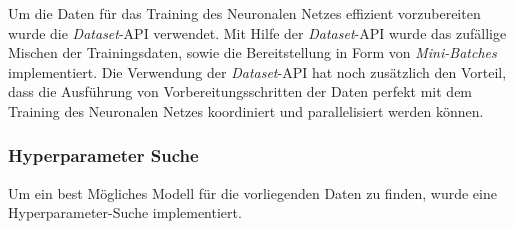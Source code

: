 Um die Daten für das Training des Neuronalen Netzes effizient vorzubereiten wurde die \emph{Dataset}-API verwendet. Mit Hilfe der \emph{Dataset}-API wurde das zufällige Mischen der Trainingsdaten, sowie die Bereitstellung in Form von \emph{Mini-Batches} implementiert. Die Verwendung der \emph{Dataset}-API hat noch zusätzlich den Vorteil, dass die Ausführung von Vorbereitungsschritten der Daten perfekt mit dem Training des Neuronalen Netzes koordiniert und parallelisiert werden können.

\subsubsection{Hyperparameter Suche}
Um ein best Mögliches Modell für die vorliegenden Daten zu finden, wurde eine Hyperparameter-Suche implementiert.
